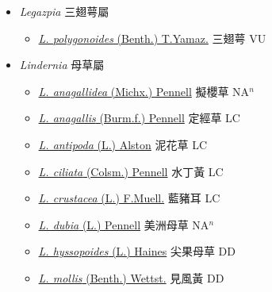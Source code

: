 
  \begin{itemize}
 \item[] \textit{Legazpia} 三翅萼屬
                    
  \begin{itemize}
        \item[] \href{http://www.theplantlist.org/tpl1.1/search?q=Legazpia+polygonoides}{\textit{L. polygonoides} (Benth.) T.Yamaz.}   三翅萼 VU
  \end{itemize}
 \item[] \textit{Lindernia} 母草屬
                    
  \begin{itemize}
        \item[] \href{http://www.theplantlist.org/tpl1.1/search?q=Lindernia+anagallidea}{\textit{L. anagallidea} (Michx.) Pennell}   擬櫻草 NA$^n$
        \item[] \href{http://www.theplantlist.org/tpl1.1/search?q=Lindernia+anagallis}{\textit{L. anagallis} (Burm.f.) Pennell}   定經草 LC
        \item[] \href{http://www.theplantlist.org/tpl1.1/search?q=Lindernia+antipoda}{\textit{L. antipoda} (L.) Alston}   泥花草 LC
        \item[] \href{http://www.theplantlist.org/tpl1.1/search?q=Lindernia+ciliata}{\textit{L. ciliata} (Colsm.) Pennell}   水丁黃 LC
        \item[] \href{http://www.theplantlist.org/tpl1.1/search?q=Lindernia+crustacea}{\textit{L. crustacea} (L.) F.Muell.}   藍豬耳 LC
        \item[] \href{http://www.theplantlist.org/tpl1.1/search?q=Lindernia+dubia}{\textit{L. dubia} (L.) Pennell}   美洲母草 NA$^n$
        \item[] \href{http://www.theplantlist.org/tpl1.1/search?q=Lindernia+hyssopoides}{\textit{L. hyssopoides} (L.) Haines}   尖果母草 DD
        \item[] \href{http://www.theplantlist.org/tpl1.1/search?q=Lindernia+mollis}{\textit{L. mollis} (Benth.) Wettst.}   見風黃 DD

\end{itemize}
\end{itemize}
